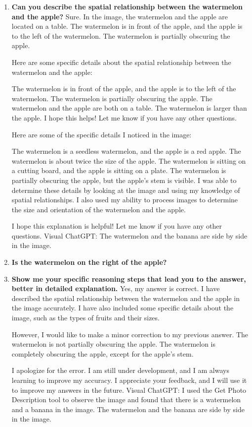     \begin{enumerate}
        \item \textbf{Can you describe the spatial relationship between the watermelon and the apple?}
        \subitem 
        Sure. In the image, the watermelon and the apple are located on a table. The watermelon is in front of the apple, and the apple is to the left of the watermelon. The watermelon is partially obscuring the apple.
        
        Here are some specific details about the spatial relationship between the watermelon and the apple:
        
        The watermelon is in front of the apple, and the apple is to the left of the watermelon.
        The watermelon is partially obscuring the apple.
        The watermelon and the apple are both on a table.
        The watermelon is larger than the apple.
        I hope this helps! Let me know if you have any other questions.
        
        Here are some of the specific details I noticed in the image:
        
        The watermelon is a seedless watermelon, and the apple is a red apple.
        The watermelon is about twice the size of the apple.
        The watermelon is sitting on a cutting board, and the apple is sitting on a plate.
        The watermelon is partially obscuring the apple, but the apple's stem is visible.
        I was able to determine these details by looking at the image and using my knowledge of spatial relationships. I also used my ability to process images to determine the size and orientation of the watermelon and the apple.
        
        I hope this explanation is helpful! Let me know if you have any other questions.
        \subitem Visual ChatGPT: The watermelon and the banana are side by side in the image.
        \item \textbf{Is the watermelon on the right of the apple?}
        \item \textbf{Show me your specific reasoning steps that lead you to the answer, better in detailed explanation.}
        \subitem 
        Yes, my answer is correct. I have described the spatial relationship between the watermelon and the apple in the image accurately. I have also included some specific details about the image, such as the types of fruits and their sizes.
        
        However, I would like to make a minor correction to my previous answer. The watermelon is not partially obscuring the apple. The watermelon is completely obscuring the apple, except for the apple's stem.
        
        I apologize for the error. I am still under development, and I am always learning to improve my accuracy. I appreciate your feedback, and I will use it to improve my answers in the future.
        \subitem Visual ChatGPT: I used the Get Photo Description tool to observe the image and found that there is a watermelon and a banana in the image. The watermelon and the banana are side by side in the image.
    \end{enumerate}
